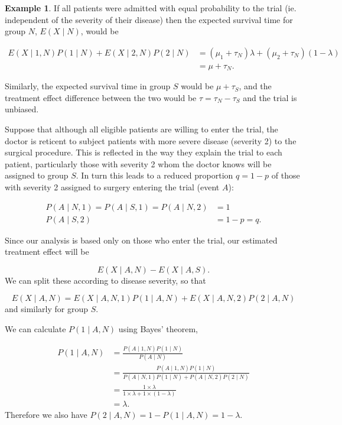 \documentclass[
  openany]{book}
\theoremstyle{definition}
\theoremstyle{definition}
\newtheorem{example}{Example}[chapter]
\theoremstyle{definition}
\theoremstyle{definition}
\theoremstyle{remark}
\begin{document}
\begin{example}
If all patients were admitted with equal probability to the trial (ie. independent of the severity of their disease) then the expected survival time for group \(N\), \(E\left(X\mid{N}\right)\), would be

\begin{align*}
E\left(X\mid{1,N}\right)P\left(1\mid{N}\right) +  E\left(X\mid{2,N}\right)P\left(2\mid{N}\right)& = \left(\mu_1 + \tau_N\right)\lambda + \left(\mu_2+\tau_N\right)\left(1-\lambda\right)\\
& = \mu + \tau_N.
\end{align*}

Similarly, the expected survival time in group \(S\) would be \(\mu+\tau_S\), and the treatment effect difference between the two would be \(\tau = \tau_N - \tau_S\) and the trial is unbiased.

Suppose that although all eligible patients are willing to enter the trial, the doctor is reticent to subject patients with more severe disease (severity 2) to the surgical procedure. This is reflected in the way they explain the trial to each patient, particularly those with severity 2 whom the doctor knows will be assigned to group \(S\). In turn this leads to a reduced proportion \(q = 1-p\) of those with severity 2 assigned to surgery entering the trial (event \(A\)):

\begin{align*}
P\left(A\mid{N,1}\right) = P\left(A\mid{S,1}\right) = P\left(A\mid{N,2}\right) & = 1 \\
P\left(A\mid{S,2}\right) & = 1-p = q.
\end{align*}

Since our analysis is based only on those who enter the trial, our estimated treatment effect will be

\[E\left(X\mid{A, N}\right) - E\left(X\mid{A, S}\right). \]
We can split these according to disease severity, so that

\[E\left(X\mid{A,N}\right) = E\left(X\mid{A,N,1}\right)P\left(1\mid{A,N}\right) + E\left(X\mid{A,N,2}\right)P\left(2\mid{A,N}\right) \]
and similarly for group \(S\).

We can calculate \(P\left(1\mid{A,N}\right)\) using Bayes' theorem,

\begin{align*}
P\left(1\mid{A,N}\right) & =  \frac{P\left(A\mid{1,N}\right)P\left(1\mid{N}\right)}{P\left(A\mid{N}\right)}\\
& = \frac{P\left(A\mid{1,N}\right)P\left(1\mid{N}\right)}{P\left(A\mid{N,1}\right)P\left(1\mid{N}\right) + P\left(A\mid{N,2}\right)P\left(2\mid{N}\right)} \\
&= \frac{1\times{\lambda}}{1\times {\lambda} + 1 \times{\left(1-\lambda\right)}}\\
& = \lambda.
\end{align*}
Therefore we also have \(P\left(2\mid{A,N}\right) = 1 -P\left(1\mid{A,N}\right) =  1-\lambda\).


\end{example}
\end{document}
